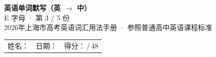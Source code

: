 \documentclass[10pt,a4paper]{article}
\begin{document}
\pagestyle{plain}

\begin{center}
{\LARGE\bfseries 英语单词默写（英 $\to$ 中）}\\[0.22em]
{\large E 字母 · 第 3 / 5 份}\\[0.18em]
{\small 2026年上海市高考英语词汇用法手册 · 参照普通高中英语课程标准}
\end{center}

\vspace{0.25em}
\noindent\begin{tabular}{@{}p{}@{}p{}@{}p{}@{}}
姓名：\underline{\hspace{2.0cm}} & 日期：\underline{\hspace{2.0cm}} & 得分：\underline{\hspace{1.3cm}}\,/\,48 \\
\end{tabular}

\vspace{0.3em}

\vspace{0.08em}
\end{document}

